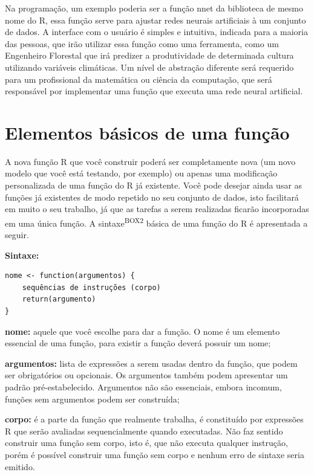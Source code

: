 \documentclass[
  11pt,
  a5paper,
  openany]{book}
\begin{document}
Na programação, um exemplo poderia ser a função nnet da biblioteca de mesmo nome do R, essa função serve para ajustar redes neurais artificiais à um conjunto de dados. A interface com o usuário é simples e intuitiva, indicada para a maioria das pessoas, que irão utilizar essa função como uma ferramenta, como um Engenheiro Florestal que irá predizer a produtividade de determinada cultura utilizando variáveis climáticas. Um nível de abstração diferente será requerido para um profissional da matemática ou ciência da computação, que será responsável por implementar uma função que executa uma rede neural artificial.

\hypertarget{elementos-buxe1sicos-de-uma-funuxe7uxe3o}{%
\section{Elementos básicos de uma função}\label{elementos-buxe1sicos-de-uma-funuxe7uxe3o}}

A nova função R que você construir poderá ser completamente nova (um novo modelo que você está testando, por exemplo) ou apenas uma modificação personalizada de uma função do R já existente. Você pode desejar ainda usar as funções já existentes de modo repetido no seu conjunto de dados, isto facilitará em muito o seu trabalho, já que as tarefas a serem realizadas ficarão incorporadas em uma única função.
A sintaxe\textsuperscript{BOX2} básica de uma função do R é apresentada a seguir.

\textbf{Sintaxe:}

\begin{verbatim}
nome <- function(argumentos) {
    sequências de instruções (corpo)
    return(argumento)
}
\end{verbatim}

\textbf{nome:} aquele que você escolhe para dar a função. O nome é um elemento essencial de uma função, para existir a função deverá possuir um nome;

\textbf{argumentos:} lista de expressões a serem usadas dentro da função, que podem ser obrigatórios ou opcionais. Os argumentos também podem apresentar um padrão pré-estabelecido. Argumentos não são essenciais, embora incomum, funções sem argumentos podem ser construída;

\textbf{corpo:} é a parte da função que realmente trabalha, é constituído por expressões R que serão avaliadas sequencialmente quando executadas. Não faz sentido construir uma função sem corpo, isto é, que não executa qualquer instrução, porém é possível construir uma função sem corpo e nenhum erro de sintaxe seria emitido.
\end{document}
